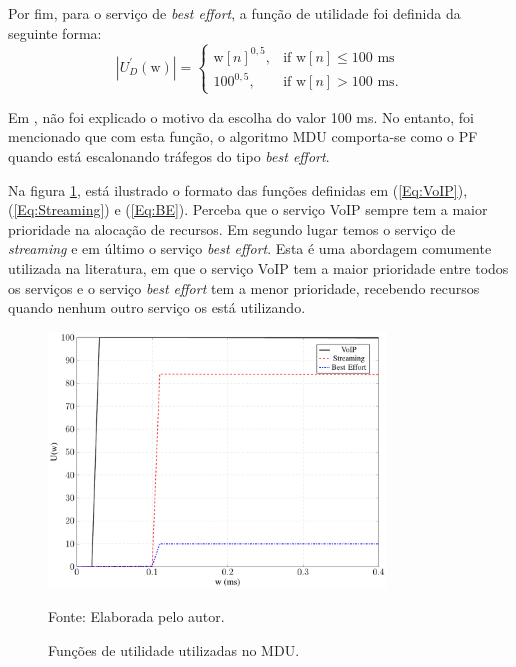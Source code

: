 Por fim, para o serviço de \textit{best effort}, a função de utilidade foi definida da seguinte forma:
%
\begin{equation}
\label{Eq:BE}
\left| U^{'}_D(\text{w}) \right| = \begin{cases} 
										\text{w}[n]^{0,5}, & \text{if  } \text{w}[n] \leq \text{100 ms} \\ 
										100^{0,5}, & \text{if  } \text{w}[n] >  \text{100 ms}. 
									\end{cases}
\end{equation}

Em , não foi explicado o motivo da escolha do valor 100 ms. No entanto, foi mencionado que com esta função, o algoritmo MDU comporta-se como o PF quando está escalonando tráfegos do tipo \textit{best effort}.

Na figura \ref{fig:WeightSong}, está ilustrado o formato das funções definidas em (\ref{Eq:VoIP}), (\ref{Eq:Streaming}) e (\ref{Eq:BE}). Perceba que o serviço VoIP sempre tem a maior prioridade na alocação de recursos. Em segundo lugar temos o serviço de \textit{streaming} e em último o serviço \textit{best effort}. Esta é uma abordagem comumente utilizada na literatura, em que o serviço VoIP tem a maior prioridade entre todos os serviços e o serviço \textit{best effort} tem a menor prioridade, recebendo recursos quando nenhum outro serviço os está utilizando.

\begin{figure}[ht]
	\centering	
	
	\caption[Funções de utilidade utilizadas no MDU]{Funções de utilidade utilizadas no MDU.}
	\includegraphics[width=0.8\textwidth]{figs/WeightsSongOriginal.pdf}
	
	{Fonte: Elaborada pelo autor.}
	\label{fig:WeightSong}
\end{figure} 


